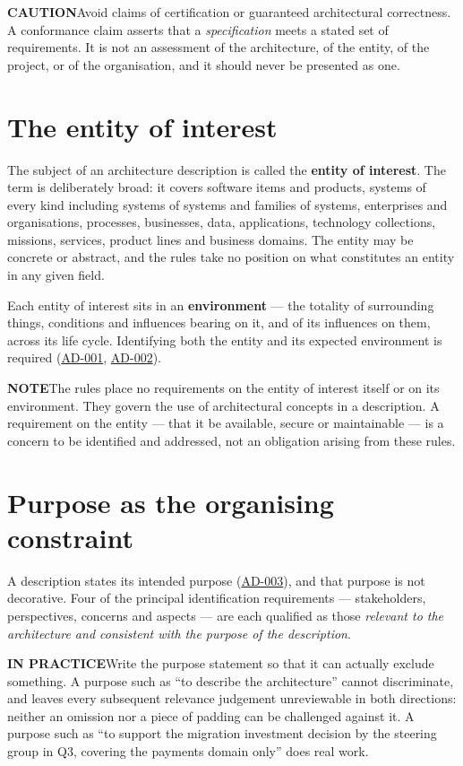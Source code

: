 \documentclass[11pt,a4paper]{report}
\newcommand{\calloutlead}[2]{{\sffamily\bfseries\footnotesize\color{#1}#2\quad}}
\newcommand{\tip}[1]{\begin{tipbox}\calloutlead{teal}{IN PRACTICE}#1\end{tipbox}}
\newcommand{\note}[1]{\begin{notebox}\calloutlead{slate}{NOTE}#1\end{notebox}}
\newcommand{\risknote}[1]{\begin{riskbox}\calloutlead{brick}{CAUTION}#1\end{riskbox}}
\newcommand{\rref}[1]{\hyperref[rule:#1]{\textsf{\small #1}}}
\begin{document}
\risknote{Avoid claims of certification or guaranteed architectural correctness.
A conformance claim asserts that a \emph{specification} meets a stated set of
requirements. It is not an assessment of the architecture, of the entity, of the
project, or of the organisation, and it should never be presented as one.}

\section{The entity of interest}

The subject of an architecture description is called the \textbf{entity of
interest}. The term is deliberately broad: it covers software items and
products, systems of every kind including systems of systems and families of
systems, enterprises and organisations, processes, businesses, data, applications,
technology collections, missions, services, product lines and business domains.
The entity may be concrete or abstract, and the rules take no position on what
constitutes an entity in any given field.

Each entity of interest sits in an \textbf{environment} --- the totality of
surrounding things, conditions and influences bearing on it, and of its
influences on them, across its life cycle. Identifying both the entity and its
expected environment is required (\rref{AD-001},
\rref{AD-002}).

\note{The rules place no requirements on the entity of interest itself or on its
environment. They govern the use of architectural concepts in a description. A
requirement on the entity --- that it be available, secure or maintainable ---
is a concern to be identified and addressed, not an obligation arising from
these rules.}

\section{Purpose as the organising constraint}

A description states its intended purpose (\rref{AD-003}), and
that purpose is not decorative. Four of the principal identification
requirements --- stakeholders, perspectives, concerns and aspects --- are each
qualified as those \emph{relevant to the architecture and consistent with the
purpose of the description}.

\tip{Write the purpose statement so that it can actually exclude something. A
purpose such as ``to describe the architecture'' cannot discriminate, and leaves
every subsequent relevance judgement unreviewable in both directions: neither an
omission nor a piece of padding can be challenged against it. A purpose such as
``to support the migration investment decision by the steering group in
Q3, covering the payments domain only'' does real work.}
\end{document}

